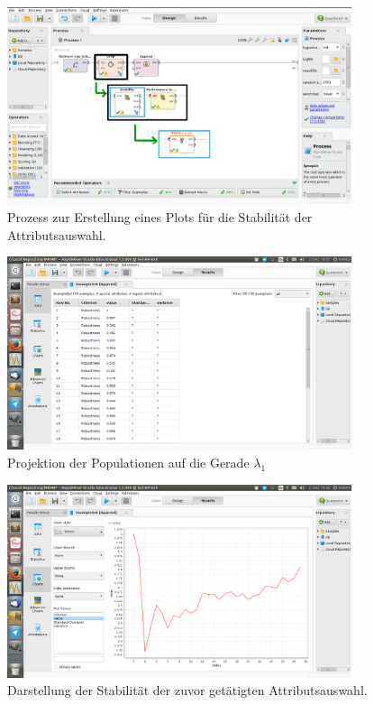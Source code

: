 \begin{figure}
	\centering
	\includegraphics[width=0.9\textwidth]{Rapidminer/Zusammenfassung.png}
	\caption{Prozess zur Erstellung eines Plots für die Stabilität der Attributsauswahl.}
\end{figure}

\begin{figure}
	\centering
	\includegraphics[width=0.9\textwidth]{Rapidminer/MRMR_results.png}
	\caption{ Projektion der Populationen auf die Gerade $\lambda_1$}
\end{figure}

\begin{figure}
	\centering
	\includegraphics[width=0.9\textwidth]{Rapidminer/Plot.png}
	\caption{Darstellung der Stabilität der zuvor getätigten Attributsauswahl.}
\end{figure}